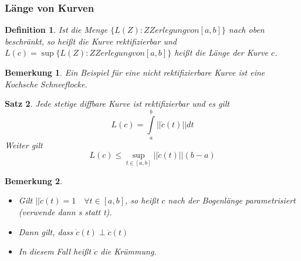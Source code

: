 \documentclass[12pt,a4paper]{report}%
\newtheorem{satz}{Satz}[section]
\newtheorem{definition}[satz]{Definition}
\newtheorem{bem}{Bemerkung}[section]
\numberwithin{equation}{section}
\numberwithin{equation}{subsection}
\begin{document}
	  \subsubsection{Länge von Kurven}
	  \begin{definition}
	    Ist die Menge $\lbrace L(Z): Z Zerlegung von [a,b] \rbrace$ nach oben beschränkt, so heißt die Kurve rektifizierbar und $L(c) = \sup \lbrace L(Z): Z Zerlegung von [a,b]\rbrace$ heißt die Länge der Kurve $c$.
	  \end{definition}
	  \begin{bem}
	    Ein Beispiel für eine nicht rektifizierbare Kurve ist eine Kochsche Schneeflocke.
	  \end{bem}
	  \begin{satz}
	    Jede stetige diffbare Kurve ist rektifizierbar und es gilt 
	    \begin{equation}
	      L(c) = \int\limits_a^b ||\dot{c}(t)|| dt
	    \end{equation}
	    Weiter gilt
	    \begin{equation}
	      L(c) \leq \sup\limits_{t \in [a,b]} || \dot{c}(t)|| (b-a)
	    \end{equation}
	  \end{satz}
	  \begin{bem}$\;$\newline
	    \begin{itemize}
	      \item[a) ] Gilt $||\dot{c}(t) = 1 \quad \forall  t \in [a,b]$, so heißt $c$ nach der Bogenlänge parametrisiert (verwende dann s statt t).
	      \item[b) ] Dann gilt, dass $\dot{c}(t) \perp \ddot{c}(t)$
	      \item[c) ] In diesem Fall heißt $\ddot{c}$ die Krümmung.
	    \end{itemize}
	  \end{bem}
\end{document}
